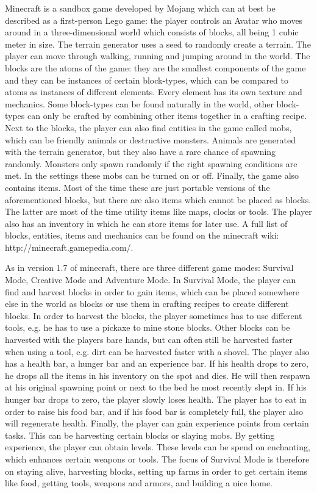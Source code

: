 \documentclass[12pt]{report} %
\begin{document}
Minecraft is a sandbox game developed by Mojang which can at best be described as a first-person Lego game: the player controls an Avatar who moves around in a three-dimensional world which consists of blocks, all being 1 cubic meter in size. The terrain generator uses a seed to randomly create a terrain. The player can move through walking, running and jumping around in the world. The blocks are the atoms of the game: they are the smallest components of the game and they can be instances of certain block-types, which can be compared to atoms as instances of different elements. Every element has its own texture and mechanics. Some block-types can be found naturally in the world, other block-types can only be crafted by combining other items together in a crafting recipe. Next to the blocks, the player can also find entities in the game called mobs, which can be friendly animals or destructive monsters. Animals are generated with the terrain generator, but they also have a rare chance of spawning randomly. Monsters only spawn randomly if the right spawning conditions are met. In the settings these mobs can be turned on or off. Finally, the game also contains items. Most of the time these are just portable versions of the aforementioned blocks, but there are also items which cannot be placed as blocks. The latter are most of the time utility items like maps, clocks or tools. The player also has an inventory in which he can store items for later use. A full list of blocks, entities, items and mechanics can be found on the minecraft wiki: http://minecraft.gamepedia.com/.

As in version 1.7 of minecraft, there are three different game modes: Survival Mode, Creative Mode and Adventure Mode. In Survival Mode, the player can find and harvest blocks in order to gain items, which can be placed somewhere else in the world as blocks or use them in crafting recipes to create different blocks. In order to harvest the blocks, the player sometimes has to use different tools, e.g. he has to use a pickaxe to mine stone blocks. Other blocks can be harvested with the players bare hands, but can often still be harvested faster when using a tool, e.g. dirt can be harvested faster with a shovel. The player also has a health bar, a hunger bar and an experience bar. If his health drops to zero, he drops all the items in his inventory on the spot and dies. He will then respawn at his original spawning point or next to the bed he most recently slept in. If his hunger bar drops to zero, the player slowly loses health. The player has to eat in order to raise his food bar, and if his  food bar is completely full, the player also will regenerate health. Finally, the player can gain experience points from certain tasks. This can be harvesting certain blocks or slaying mobs. By getting experience, the player can obtain levels. These levels can be spend on enchanting, which enhances certain weapons or tools. The focus of Survival Mode is therefore on staying alive, harvesting blocks, setting up farms in order to get certain items like food, getting tools, weapons and armors, and building a nice home.
\end{document}
